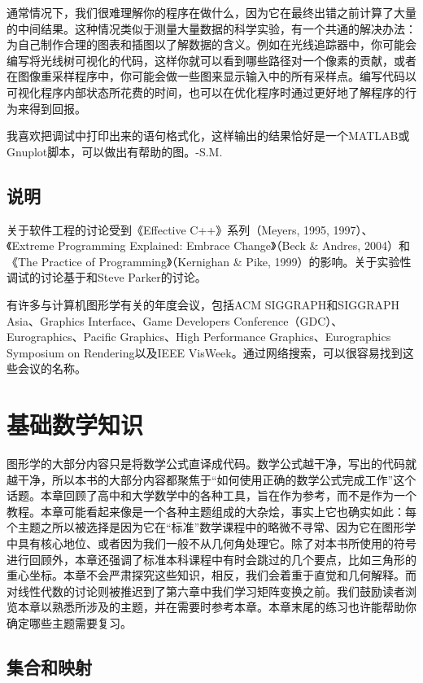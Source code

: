 \documentclass[lang=cn,12pt]{elegantbook}
\begin{document}
通常情况下，我们很难理解你的程序在做什么，因为它在最终出错之前计算了大量的中间结果。这种情况类似于测量大量数据的科学实验，有一个共通的解决办法：为自己制作合理的图表和插图以了解数据的含义。例如在光线追踪器中，你可能会编写将光线树可视化的代码，这样你就可以看到哪些路径对一个像素的贡献，或者在图像重采样程序中，你可能会做一些图来显示输入中的所有采样点。编写代码以可视化程序内部状态所花费的时间，也可以在优化程序时通过更好地了解程序的行为来得到回报。

\begin{note}
  我喜欢把调试中打印出来的语句格式化，这样输出的结果恰好是一个MATLAB\textsuperscript{\textregistered}或Gnuplot脚本，可以做出有帮助的图。-S.M.
\end{note}

\section*{说明}
关于软件工程的讨论受到《Effective C++》系列（Meyers, 1995, 1997）、《Extreme Programming Explained: Embrace Change》（Beck \& Andres, 2004）和《The Practice of Programming》（Kernighan \& Pike, 1999）的影响。关于实验性调试的讨论基于和Steve Parker的讨论。

有许多与计算机图形学有关的年度会议，包括ACM SIGGRAPH和SIGGRAPH Asia、Graphics Interface、Game Developers Conference（GDC）、Eurographics、Pacific Graphics、High Performance Graphics、Eurographics Symposium on Rendering以及IEEE VisWeek。通过网络搜索，可以很容易找到这些会议的名称。

\chapter{基础数学知识}

图形学的大部分内容只是将数学公式直译成代码。数学公式越干净，写出的代码就越干净，所以本书的大部分内容都聚焦于“如何使用正确的数学公式完成工作”这个话题。本章回顾了高中和大学数学中的各种工具，旨在作为参考，而不是作为一个教程。本章可能看起来像是一个各种主题组成的大杂烩，事实上它也确实如此：每个主题之所以被选择是因为它在“标准”数学课程中的略微不寻常、因为它在图形学中具有核心地位、或者因为我们一般不从几何角处理它。除了对本书所使用的符号进行回顾外，本章还强调了标准本科课程中有时会跳过的几个要点，比如三角形的重心坐标。本章不会严肃探究这些知识，相反，我们会着重于直觉和几何解释。而对线性代数的讨论则被推迟到了第六章中我们学习矩阵变换之前。我们鼓励读者浏览本章以熟悉所涉及的主题，并在需要时参考本章。本章末尾的练习也许能帮助你确定哪些主题需要复习。

\section{集合和映射}
\end{document}
